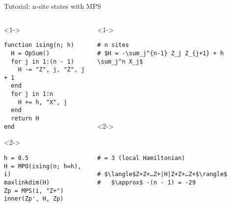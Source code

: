 \begin{frame}[fragile]{Tutorial: n-site states with MPS}


\begin{columns}

\begin{column}{5cm}

\begin{onlyenv}<1->

\begin{lstlisting}[language=JuliaLocal, style=julia, mathescape, basicstyle=\small]
function ising(n; h)
  H = OpSum()
  for j in 1:(n - 1)
    H -= "Z", j, "Z", j + 1
  end
  for j in 1:n
    H += h, "X", j
  end
  return H
end
\end{lstlisting}

\end{onlyenv}

\begin{onlyenv}<2->

\begin{lstlisting}[language=JuliaLocal, style=julia, mathescape, basicstyle=\small]
h = 0.5
H = MPO(ising(n; h=h), i)
maxlinkdim(H)
Zp = MPS(i, "Z+")
inner(Zp', H, Zp)
 \end{lstlisting}

\end{onlyenv}

\end{column}

\begin{column}{5.5cm}

\begin{onlyenv}<1->

\begin{lstlisting}[style=julia, numbers=none, mathescape, basicstyle=\small]
# n sites
# $H = -\sum_j^{n-1} Z_j Z_{j+1} + h \sum_j^n X_j$







 \end{lstlisting}

\end{onlyenv}

\begin{onlyenv}<2->

\begin{lstlisting}[style=julia, numbers=none, mathescape, basicstyle=\small]


# = 3 (local Hamiltonian)

# $\langle$Z+Z+…Z+|H|Z+Z+…Z+$\rangle$
#   $\approx$ -(n - 1) = -29
\end{lstlisting}

\end{onlyenv}

\end{column}

\end{columns}

\end{frame}
